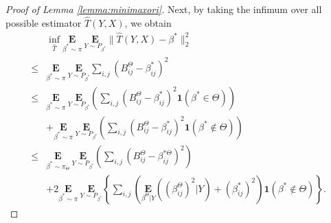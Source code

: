 \documentclass[12pt]{article}
\newtheorem{proof}{Proof}
\begin{document}
\begin{appendix}
\begin{proof}[Proof of Lemma \ref{lemma:minimaxori}]
Next, by taking the infimum over all possible estimator $\hat T(Y,X)$, we obtain
\begin{equation}\label{3partori}
\begin{aligned}
&\inf_{\hat T } \underset{\beta^* \sim \pi}{\mathbf E}~\underset{Y \sim P_{\beta^*} }{\mathbf E} \|\hat T(Y,X) - \beta^*\|_2^2 \\
\le & \underset{\beta^* \sim \pi}{\mathbf E}~\underset{Y \sim P_{\beta^*} }{\mathbf E} \sum_{i,j} \left(B_{ij}^{\Theta}  - \beta_{ij}^* \right)^2 \\
\le & \underset{\beta^* \sim \pi}{\mathbf E}~\underset{Y \sim P_{\beta^*} }{\mathbf E} \left( \sum_{i,j} \left(B_{ij}^{\Theta} - \beta_{ij}^* \right)^2 \mathbf1(\beta^* \in {\Theta}) \right)\\
   & + \underset{\beta^* \sim \pi}{\mathbf E}~\underset{Y \sim P_{\beta^*} }{\mathbf E} \left( \sum_{i,j}\left(B_{ij}^{\Theta} - \beta_{ij}^* \right)^2 \mathbf1(\beta^* \notin {\Theta}) \right) \\
\le& \underset{\beta^* \sim \pi_{\Theta}}{\mathbf E}~\underset{Y \sim P_{\beta^* } }{\mathbf E}  
    \left( \sum_{i,j} \left(B_{ij}^{\Theta} - \beta_{ij}^{*{\Theta}} \right)^2 \right)\\
    &+ 2\underset{\beta^* \sim \pi}{\mathbf E}~\underset{Y \sim P_{\beta^*} }{\mathbf E} 
    \left\{  \sum_{i,j} \left( \underset{\beta^{ {\Theta}}|Y}{\mathbf E} 
    \left( \left(\beta_{ij}^{ {\Theta}}\right)^2 \big| Y \right)  
    + (\beta_{ij}^*)^2  \right) \mathbf1(\beta^* \notin {\Theta}) \right\}.
\end{aligned}
\end{equation}


\end{proof}
\end{appendix}
\end{document}
